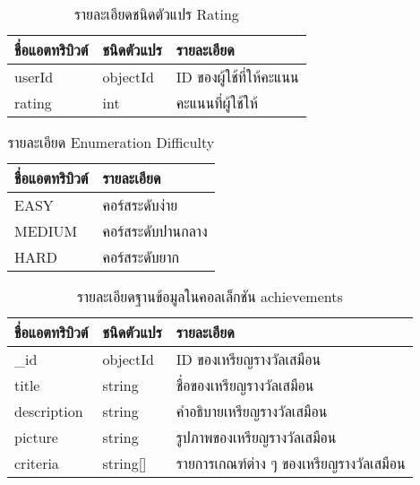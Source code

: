 \begin{table}
    \caption{รายละเอียดชนิดตัวแปร Rating}
    \begin{tabularx}{\textwidth}{ | l | l | X | }
        \hline
        \bf ชื่อแอตทริบิวต์ & \bf ชนิดตัวแปร & \bf รายละเอียด \\\hline
        userId & objectId & ID ของผู้ใช้ที่ให้คะแนน\\\hline
        rating & int & คะแนนที่ผู้ใช้ให้\\\hline
    \end{tabularx}
\end{table}

\begin{table}
    \caption{รายละเอียด Enumeration Difficulty}
    \begin{tabularx}{\textwidth}{ | l | X | }
        \hline
        \bf ชื่อแอตทริบิวต์ & \bf รายละเอียด \\\hline
        EASY & คอร์สระดับง่าย\\\hline
        MEDIUM & คอร์สระดับปานกลาง\\\hline
        HARD & คอร์สระดับยาก\\\hline
    \end{tabularx}
\end{table}

\begin{table}
    \caption{รายละเอียดฐานข้อมูลในคอลเล็กชัน achievements}
    \begin{tabularx}{\textwidth}{ | l | l | X | }
        \hline
        \bf ชื่อแอตทริบิวต์ & \bf ชนิดตัวแปร & \bf รายละเอียด \\\hline
        \_id & objectId & ID ของเหรียญรางวัลเสมือน\\\hline
        title & string & ชื่อของเหรียญรางวัลเสมือน\\\hline
        description & string & คำอธิบายเหรียญรางวัลเสมือน\\\hline
        picture & string & รูปภาพของเหรียญรางวัลเสมือน\\\hline
        criteria & string[] & รายการเกณฑ์ต่าง ๆ ของเหรียญรางวัลเสมือน\\\hline
    \end{tabularx}
\end{table}

